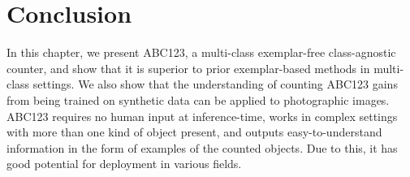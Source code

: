 \documentclass[../thesis.tex]{subfiles}
\begin{document}
\section{Conclusion}
\label{conclusion}
In this chapter, we present ABC123, a multi-class exemplar-free class-agnostic counter, and show that it is superior to prior exemplar-based methods in multi-class settings.
We also show that the understanding of counting ABC123 gains from being trained on synthetic data can be applied to photographic images.
ABC123 requires no human input at inference-time, works in complex settings with more than one kind of object present, and outputs easy-to-understand information in the form of examples of the counted objects.
Due to this, it has good potential for deployment in various fields.
\end{document}
